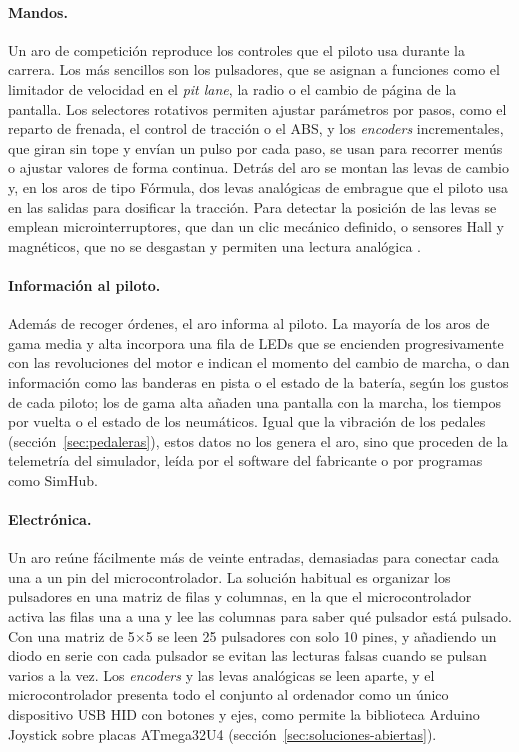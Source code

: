 \paragraph{Mandos.}
Un aro de competición reproduce los controles que el piloto usa durante la carrera. Los más sencillos son los pulsadores, que se asignan a funciones como el limitador de velocidad en el \textit{pit lane}, la radio o el cambio de página de la pantalla. Los selectores rotativos permiten ajustar parámetros por pasos, como el reparto de frenada, el control de tracción o el ABS, y los \textit{encoders} incrementales, que giran sin tope y envían un pulso por cada paso, se usan para recorrer menús o ajustar valores de forma continua. Detrás del aro se montan las levas de cambio y, en los aros de tipo Fórmula, dos levas analógicas de embrague que el piloto usa en las salidas para dosificar la tracción. Para detectar la posición de las levas se emplean microinterruptores, que dan un clic mecánico definido, o sensores Hall y magnéticos, que no se desgastan y permiten una lectura analógica \parencite{ramsden_2006_hall}.

\paragraph{Información al piloto.}
Además de recoger órdenes, el aro informa al piloto. La mayoría de los aros de gama media y alta incorpora una fila de LEDs que se encienden progresivamente con las revoluciones del motor e indican el momento del cambio de marcha, o dan información como las banderas en pista o el estado de la batería, según los gustos de cada piloto; los de gama alta añaden una pantalla con la marcha, los tiempos por vuelta o el estado de los neumáticos. Igual que la vibración de los pedales (sección~\ref{sec:pedaleras}), estos datos no los genera el aro, sino que proceden de la telemetría del simulador, leída por el software del fabricante o por programas como SimHub.

\paragraph{Electrónica.}
Un aro reúne fácilmente más de veinte entradas, demasiadas para conectar cada una a un pin del microcontrolador. La solución habitual es organizar los pulsadores en una matriz de filas y columnas, en la que el microcontrolador activa las filas una a una y lee las columnas para saber qué pulsador está pulsado. Con una matriz de 5$\times$5 se leen 25 pulsadores con solo 10 pines, y añadiendo un diodo en serie con cada pulsador se evitan las lecturas falsas cuando se pulsan varios a la vez. Los \textit{encoders} y las levas analógicas se leen aparte, y el microcontrolador presenta todo el conjunto al ordenador como un único dispositivo USB HID con botones y ejes, como permite la biblioteca Arduino Joystick sobre placas ATmega32U4 (sección~\ref{sec:soluciones-abiertas}).

